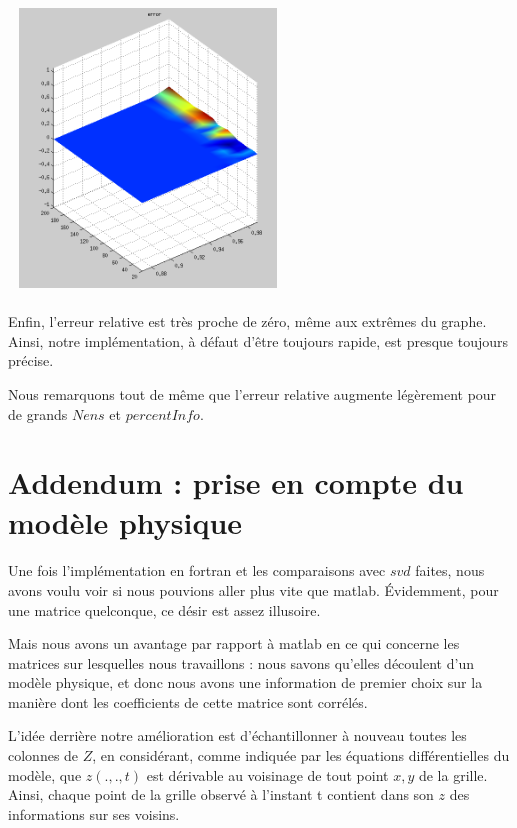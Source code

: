 \documentclass[a4paper,12pt]{article}
\begin{document}
    \bigskip
    \begin{center}
    \includegraphics[width=20em, height=20em]{error.png}
    \end{center}

    \paragraph{}
    Enfin, l'erreur relative est très proche de zéro, même aux extrêmes du graphe.
    Ainsi, notre implémentation, à défaut d'être toujours rapide, est presque toujours
    précise.

    Nous remarquons tout de même que l'erreur relative augmente légèrement pour de
    grands $Nens$ et $percentInfo$.

\newpage
\section{Addendum : prise en compte du modèle physique}

    \paragraph{}
    Une fois l'implémentation en fortran et les comparaisons avec $svd$ faites,
    nous avons voulu voir si nous pouvions aller plus vite que matlab. Évidemment,
    pour une matrice quelconque, ce désir est assez illusoire.

    Mais nous avons un avantage par rapport à matlab en ce qui concerne les
    matrices sur lesquelles nous travaillons : nous savons qu'elles découlent
    d'un modèle physique, et donc nous avons une information de premier choix
    sur la manière dont les coefficients de cette matrice sont corrélés.

    L'idée derrière notre amélioration est d'échantillonner à nouveau toutes les
    colonnes de $Z$, en considérant, comme indiquée par les équations différentielles
    du modèle, que $z(.,.,t)$ est dérivable au voisinage de tout point $x,y$ de la grille.
    Ainsi, chaque point de la grille observé à l'instant t contient dans son $z$ des
    informations sur ses voisins.
\end{document}
